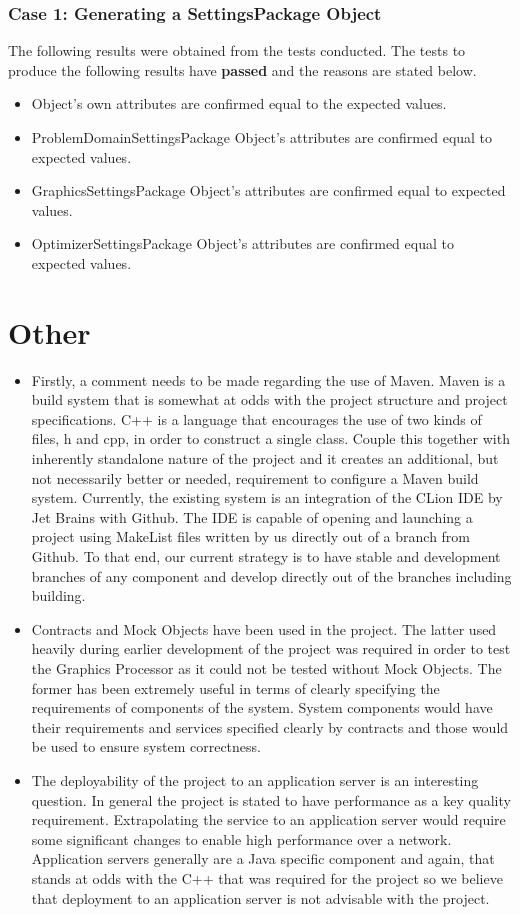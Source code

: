 \documentclass[11pt]{article}
\begin{document}
\subsubsection{Case 1: Generating a SettingsPackage Object}
The following results were obtained from the tests conducted. The tests to produce the
following results have \textbf{passed} and the reasons are stated below.

\begin{itemize}
	\item Object's own attributes are confirmed equal to the expected values.
	\item ProblemDomainSettingsPackage Object's attributes are confirmed equal to expected values.
	\item GraphicsSettingsPackage Object's attributes are confirmed equal to expected values.
	\item OptimizerSettingsPackage Object's attributes are confirmed equal to expected values.
\end{itemize}


\section{Other}
\begin{itemize}
\item Firstly, a comment needs to be made regarding the use of Maven. Maven is a build system that is somewhat at odds with the project structure and project specifications. C++ is a language that encourages the use of two kinds of files, h and cpp, in order to construct a single class. Couple this together with inherently standalone nature of the project and it creates an additional, but not necessarily better or needed, requirement to configure a Maven build system. Currently, the existing system is an integration of the CLion IDE by Jet Brains with Github. The IDE is capable of opening and launching a project using MakeList files written by us directly out of a branch from Github. To that end, our current strategy is to have stable and development branches of any component and develop directly out of the branches including building.
\item Contracts and Mock Objects have been used in the project. The latter used heavily during earlier development of the project was required in order to test the Graphics Processor as it could not be tested without Mock Objects. The former has been extremely useful in terms of clearly specifying the requirements of components of the system. System components would have their requirements and services specified clearly by contracts and those would be used to ensure system correctness.
\item The deployability of the project to an application server is an interesting question. In general the project is stated to have performance as a key quality requirement. Extrapolating the service to an application server would require some significant changes to enable high performance over a network. Application servers generally are a Java specific component and again, that stands at odds with the C++ that was required for the project so we believe that deployment to an application server is not advisable with the project.
\end{itemize}
\end{document}
